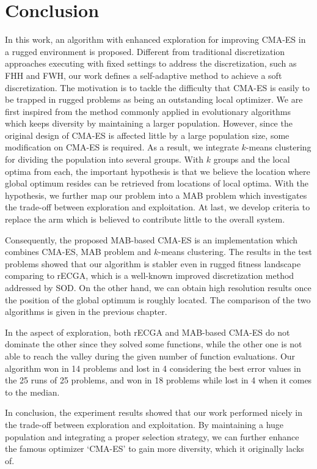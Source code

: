 \chapter{Conclusion} \label{ch:conclusion}

In this work, an algorithm with enhanced exploration for improving CMA-ES in a
rugged environment is proposed.
Different from traditional discretization approaches executing with
fixed settings to address the discretization, such as FHH and FWH, our
work defines a self-adaptive method to achieve a soft discretization.
The motivation is to tackle the difficulty that CMA-ES is easily to be
trapped in rugged problems as being an outstanding local optimizer.
We are first inspired from the method commonly applied in evolutionary
algorithms which keeps diversity by maintaining a larger population.
However, since the original design of CMA-ES is affected little by a
large population size, some modification on CMA-ES is required.
As a result, we integrate $k$-means clustering for dividing the
population into several groups.
With $k$ groups and the local optima from each, the important hypothesis
is that we believe the location where global optimum resides can be
retrieved from locations of local optima.
With the hypothesis, we further map our problem into a MAB problem which
investigates the trade-off between exploration and exploitation.
At last, we develop criteria to replace the arm which is believed to
contribute little to the overall system.

Consequently, the proposed MAB-based CMA-ES is an implementation which
combines CMA-ES, MAB problem and $k$-means clustering.
The results in the test problems showed that our algorithm is stabler
even in rugged fitness landscape comparing to rECGA, which is a
well-known improved discretization method addressed by SOD.
On the other hand, we can obtain high resolution results once the
position of the global optimum is roughly located.
The comparison of the two algorithms is given in the previous chapter.

In the aspect of exploration, both rECGA and MAB-based CMA-ES do not
dominate the other since they solved some functions, while the other one
is not able to reach the valley during the given number of function
evaluations.
Our algorithm won in 14 problems and lost in 4 considering the best
error values in the 25 runs of 25 problems, and won in 18 problems while
lost in 4 when it comes to the median.

In conclusion, the experiment results showed that our work performed
nicely in the trade-off between exploration and exploitation.
By maintaining a huge population and integrating a proper selection strategy,
we can further enhance the famous optimizer `CMA-ES' to gain more
diversity, which it originally lacks of. 

